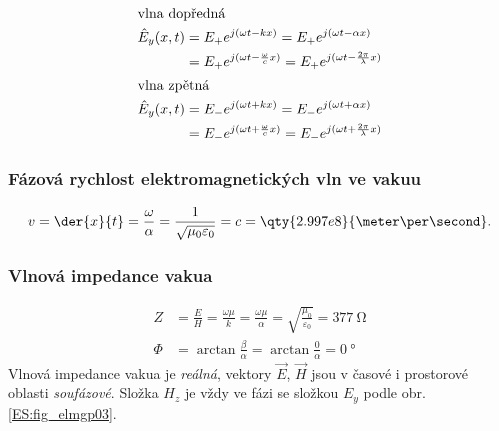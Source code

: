         \begin{subequations}
          \begin{align}
            \shortintertext{vlna dopředná}
            \hat{E}_y(x,t) 
              &= E_+e^{j(\omega t - kx)} 
               = E_+e^{j(\omega t - \alpha x)}                    \nonumber \\
              &= E_+e^{j(\omega t - \frac{\omega}{c}x)}
               = E_+e^{j(\omega t - \frac{2\pi}{\lambda}x)}       \label{ES:eq_elmagp38a}   \\
            \shortintertext{vlna zpětná}
            \hat{E}_y(x,t) 
              &= E_-e^{j(\omega t + kx)}
               = E_-e^{j(\omega t + \alpha x)}                    \nonumber \\
              &= E_-e^{j(\omega t + \frac{\omega}{c}x)} 
               = E_-e^{j(\omega t + \frac{2\pi}{\lambda}x)}       \label{ES:eq_elmagp38b}
          \end{align}
        \end{subequations}

      \subsubsection{Fázová rychlost elektromagnetických vln ve vakuu}
        \begin{equation}\label{ES:eq_elmagp39}
          v = \der{x}{t} = \frac{\omega}{\alpha} = \frac{1}{\sqrt{\mu_0\varepsilon_0}}
            = c 
            = \qty{2.997e8}{\meter\per\second}.
        \end{equation}

      \subsubsection{Vlnová impedance vakua}
        \begin{align}
             Z &= \frac{E}{H} = \frac{\omega\mu}{k} 
                = \frac{\omega\mu}{\alpha} 
                = \sqrt{\frac{\mu_0}{\varepsilon_0}} = \qty{377}{\ohm}  \label{ES:eq_elmagp40a} \\
          \Phi &= \arctan\frac{\beta}{\alpha} 
                = \arctan\frac{0}{\alpha} = \qty{0}{\degree}            \label{ES:eq_elmagp40b} 
        \end{align}
        Vlnová impedance vakua je \emph{reálná}, vektory \(\vec{E}\), \(\vec{H}\) jsou v časové i 
        prostorové oblasti \emph{soufázové}. Složka \(H_z\) je vždy ve fázi se složkou \(E_y\) 
        podle obr. \ref{ES:fig_elmgp03}.

